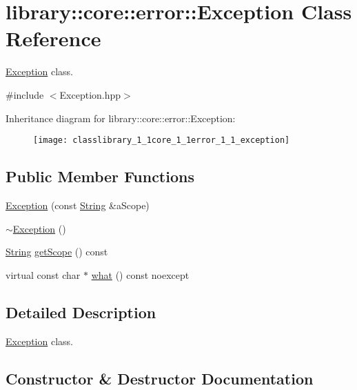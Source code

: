 \hypertarget{classlibrary_1_1core_1_1error_1_1_exception}{}\section{library\+:\+:core\+:\+:error\+:\+:Exception Class Reference}
\label{classlibrary_1_1core_1_1error_1_1_exception}


\hyperlink{classlibrary_1_1core_1_1error_1_1_exception}{Exception} class.  




{\ttfamily \#include $<$Exception.\+hpp$>$}

Inheritance diagram for library\+:\+:core\+:\+:error\+:\+:Exception\+:\begin{figure}[H]
\begin{center}
\leavevmode
\texttt{[image: classlibrary\_1\_1core\_1\_1error\_1\_1\_exception]}
\end{center}
\end{figure}
\subsection*{Public Member Functions}
\begin{DoxyCompactItemize}
\item 
\hyperlink{classlibrary_1_1core_1_1error_1_1_exception_a8e0c32779ff9a01d992d810848c841b7}{Exception} (const \hyperlink{classlibrary_1_1core_1_1types_1_1_string}{String} \&a\+Scope)
\item 
\hyperlink{classlibrary_1_1core_1_1error_1_1_exception_a2fc342415e921c6037465806d278d7d0}{$\sim$\+Exception} ()
\item 
\hyperlink{classlibrary_1_1core_1_1types_1_1_string}{String} \hyperlink{classlibrary_1_1core_1_1error_1_1_exception_a9c20da352aa0785b837b43cd52d09500}{get\+Scope} () const
\item 
virtual const char $\ast$ \hyperlink{classlibrary_1_1core_1_1error_1_1_exception_ab318a927162519b15961ca66be07fd6b}{what} () const noexcept
\end{DoxyCompactItemize}


\subsection{Detailed Description}
\hyperlink{classlibrary_1_1core_1_1error_1_1_exception}{Exception} class. 

\subsection{Constructor \& Destructor Documentation}
\mbox{\label{classlibrary_1_1core_1_1error_1_1_exception_a8e0c32779ff9a01d992d810848c841b7}} 
